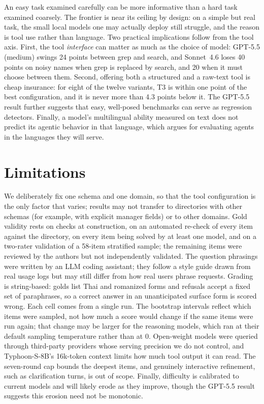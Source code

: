 \documentclass[11pt]{article}
\begin{document}
An easy task examined carefully can be more informative than a hard task examined coarsely. The frontier
is near its ceiling by design: on a simple but real task, the small local models one may actually deploy
still struggle, and the reason is tool use rather than language. Two practical implications follow from
the tool axis. First, the tool \emph{interface} can matter as much as the choice of model: GPT-5.5
(medium) swings 24 points between grep and search, and Sonnet~4.6 loses 40 points on noisy names when grep is
replaced by search, and 20 when it must choose between them. Second, offering both a structured and a
raw-text tool is cheap insurance: for eight of the twelve variants, T3 is within one point of the best
configuration, and it is never more than 4.3 points below it.
The GPT-5.5 result further suggests that easy, well-posed benchmarks can serve as regression detectors. Finally, a model's multilingual ability measured on text
does not predict its agentic behavior in that language, which argues for evaluating agents in the
languages they will serve.

\section*{Limitations}

We deliberately fix one schema and one domain, so that the tool configuration is the only factor that
varies; results may not transfer to directories with other schemas (for example, with explicit manager
fields) or to other domains. Gold validity rests on checks at construction, on an automated re-check of
every item against the directory, on every item being solved by at least one model, and on a two-rater
validation of a 58-item stratified sample; the remaining items were reviewed by the authors but not
independently validated. The question phrasings were written by an LLM coding assistant; they follow a
style guide drawn from real usage logs but may still differ from how real users phrase requests. Grading is string-based: golds list
Thai and romanized forms and refusals accept a fixed set of paraphrases, so a correct answer in an
unanticipated surface form is scored wrong. Each cell comes from a single run. The bootstrap intervals
reflect which items were sampled, not how much a score would change if the same items were run again;
that change may be larger for the reasoning models, which ran at their default sampling temperature
rather than at 0. Open-weight models were queried
through third-party providers whose serving precision we do not control, and Typhoon-S-8B's 16k-token
context limits how much tool output it can read. The seven-round cap bounds the deepest items, and
genuinely interactive refinement, such as clarification turns, is out of scope. Finally, difficulty is
calibrated to current models and will likely erode as they improve, though the GPT-5.5 result suggests
this erosion need not be monotonic.
\end{document}
